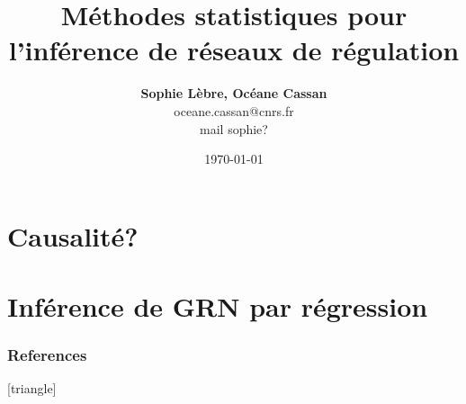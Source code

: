 \documentclass[xcolor=dvipsnames]{beamer}
\title[L'inférence statistique de GRN]{Méthodes statistiques pour l'inférence de réseaux de régulation}
\date{\today}
\author[Sophie Lèbre, Océane Cassan]
{\textbf{Sophie Lèbre, Océane Cassan} \\ oceane.cassan@cnrs.fr \\ mail sophie?}
\institute[]{
BFP M1, Parcours Bipa}
\begin{document}
	
	\begin{frame}
		\titlepage
	\end{frame}
	
	\begin{frame}
		\tableofcontents
	\end{frame}
	
	

    
    
\section{Causalité?}


    	

    	
\section{Inférence de GRN par régression}


    
	
	
	
	
	
	
	
	
	
	


\begin{frame}[allowframebreaks]
    \frametitle{References}
    [triangle]
    \scriptsize
    
    
\end{frame}
\end{document}

